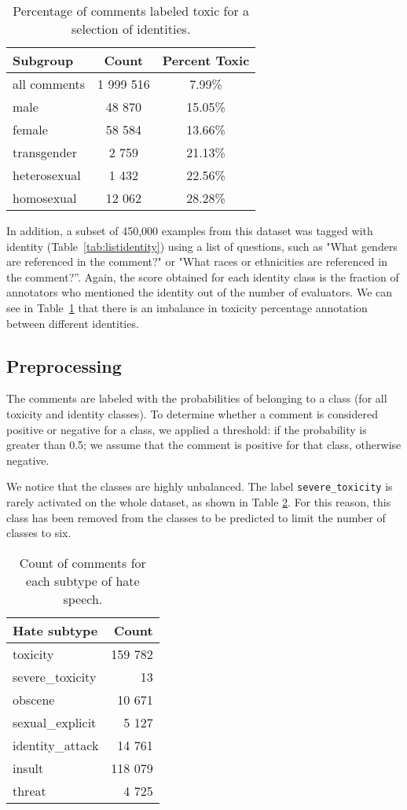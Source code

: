 \documentclass[a4paper,english]{rnti}
\begin{document}
\begin{table}[ht]
\centering
\begin{tabular}{lcc}
\hline
{\bf Subgroup} & {\bf Count} & {\bf Percent Toxic} \\\hline
all comments & 1 999 516 & 7.99\% \\\hline
male & 48 870 & 15.05\% \\
female & 58 584 & 13.66\% \\
transgender & 2 759 & 21.13\% \\
heterosexual & 1 432 & 22.56\% \\
homosexual & 12 062 & 28.28\% \\\hline
\end{tabular}
\caption{Percentage of comments labeled toxic for a selection of identities.}
\label{tab:peridentity}
\end{table}

In addition, a subset of 450,000 examples from this dataset was tagged with identity (Table~\ref{tab:listidentity}) using a list of questions, such as "What genders are referenced in the comment?" or "What races or ethnicities are referenced in the comment?”. Again, the score obtained for each identity class is the fraction of annotators who mentioned the identity out of the number of evaluators. We can see in Table~\ref{tab:peridentity} that there is an imbalance in toxicity percentage annotation between different identities. 

\subsection{Preprocessing}

The comments are labeled with the probabilities of belonging to a class (for all toxicity and identity classes). To determine whether a comment is considered positive or negative for a class, we applied a threshold: if the probability is greater than 0.5; we assume that the comment is positive for that class, otherwise negative.

We notice that the classes are highly unbalanced. The label \texttt{severe\_toxicity} is rarely activated on the whole dataset, as shown in Table \ref{tab:counthatetype}. For this reason, this class has been removed from the classes to be predicted to limit the number of classes to six.

\begin{table}[ht]
\centering
\begin{tabular}{lr}
\hline
{\bf Hate subtype} & {\bf Count} \\\hline
toxicity & 159 782 \\
severe\_toxicity & 13 \\
obscene & 10 671 \\
sexual\_explicit & 5 127 \\
identity\_attack & 14 761 \\
insult & 118 079 \\
threat & 4 725 \\
\hline
\end{tabular}
\caption{Count of comments for each subtype of hate speech.}
\label{tab:counthatetype}
\end{table}
\end{document}
